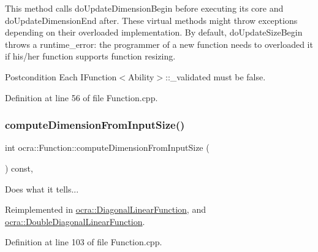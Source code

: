 This method calls {\ttfamily do\+Update\+Dimension\+Begin} before executing its core and do\+Update\+Dimension\+End after. These virtual methods might throw exceptions depending on their overloaded implementation. By default, do\+Update\+Size\+Begin throws a runtime\+\_\+error\+: the programmer of a new function needs to overloaded it if his/her function supports function resizing.

\begin{DoxyPostcond}{Postcondition}
Each I\+Function$<$\+Ability$>$\+::\+\_\+validated must be false. 
\end{DoxyPostcond}


Definition at line 56 of file Function.\+cpp.

\hypertarget{classocra_1_1Function_a95241fd426f887c5eb3add3f1e55a09c}{}\label{classocra_1_1Function_a95241fd426f887c5eb3add3f1e55a09c} 
\subsubsection{\texorpdfstring{compute\+Dimension\+From\+Input\+Size()}{computeDimensionFromInputSize()}}
{\footnotesize\ttfamily int ocra\+::\+Function\+::compute\+Dimension\+From\+Input\+Size (\begin{DoxyParamCaption}{ }\end{DoxyParamCaption}) const\hspace{0.3cm}{\ttfamily [protected]}, {\ttfamily [virtual]}}

Does what it tells... 

Reimplemented in \hyperlink{classocra_1_1DiagonalLinearFunction_af41faa708f35e39c2f797f70ae7ce695}{ocra\+::\+Diagonal\+Linear\+Function}, and \hyperlink{classocra_1_1DoubleDiagonalLinearFunction_af449f5bb219672d4f316a0d626436ec8}{ocra\+::\+Double\+Diagonal\+Linear\+Function}.



Definition at line 103 of file Function.\+cpp.

\hypertarget{classocra_1_1Function_a0b0f0b2bf97e25130b51ed7b6c62c357}{}\label{classocra_1_1Function_a0b0f0b2bf97e25130b51ed7b6c62c357} 
